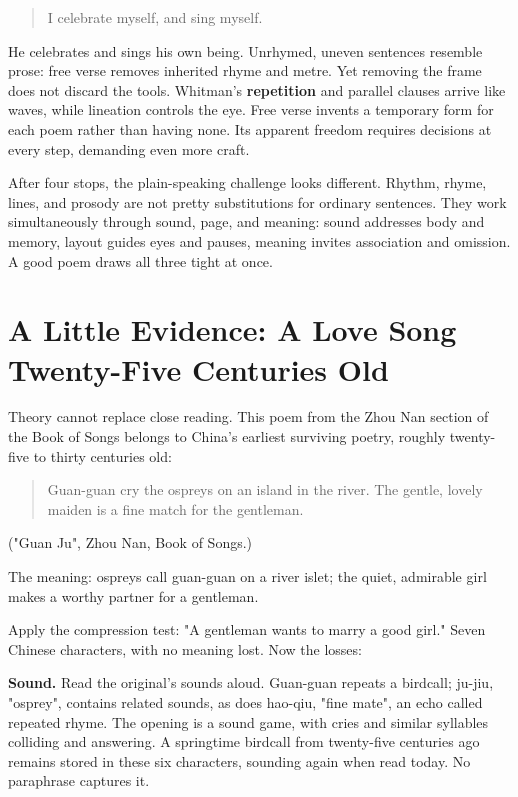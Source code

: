 \begin{quote}
I celebrate myself, and sing myself.
\end{quote}
He celebrates and sings his own being. Unrhymed, uneven sentences resemble prose: free verse removes inherited rhyme and metre. Yet removing the frame does not discard the tools. Whitman's \textbf{repetition} and parallel clauses arrive like waves, while lineation controls the eye. Free verse invents a temporary form for each poem rather than having none. Its apparent freedom requires decisions at every step, demanding even more craft.

After four stops, the plain-speaking challenge looks different. Rhythm, rhyme, lines, and prosody are not pretty substitutions for ordinary sentences. They work simultaneously through sound, page, and meaning: sound addresses body and memory, layout guides eyes and pauses, meaning invites association and omission. A good poem draws all three tight at once.

\section[Evidence: An Ancient Love Song]{A Little Evidence: A Love Song Twenty-Five Centuries Old}
Theory cannot replace close reading. This poem from the Zhou Nan section of the Book of Songs belongs to China's earliest surviving poetry, roughly twenty-five to thirty centuries old:

\begin{quote}
Guan-guan cry the ospreys on an island in the river. The gentle, lovely maiden is a fine match for the gentleman.
\end{quote}
("Guan Ju", Zhou Nan, Book of Songs.)

The meaning: ospreys call guan-guan on a river islet; the quiet, admirable girl makes a worthy partner for a gentleman.

Apply the compression test: "A gentleman wants to marry a good girl." Seven Chinese characters, with no meaning lost. Now the losses:

\textbf{Sound.} Read the original's sounds aloud. Guan-guan repeats a birdcall; ju-jiu, "osprey", contains related sounds, as does hao-qiu, "fine mate", an echo called repeated rhyme. The opening is a sound game, with cries and similar syllables colliding and answering. A springtime birdcall from twenty-five centuries ago remains stored in these six characters, sounding again when read today. No paraphrase captures it.

